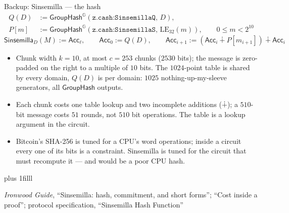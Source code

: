 \documentclass[aspectratio=169,11pt]{beamer}
\newcommand{\G}{\mathbb{G}}
\newcommand{\GroupHash}{\ensuremath{\mathsf{GroupHash}}}
\newcommand{\src}[1]{\par\vskip0pt plus 1filll
  {\fontsize{6}{7.2}\selectfont\color{arbdim}\raggedright #1\par}}
\begin{document}
\begin{frame}{Backup: Sinsemilla --- the hash}
\vspace*{-4pt}
\setlength{\abovedisplayskip}{3pt}\setlength{\belowdisplayskip}{3pt}
\begin{align*}
Q(D) &:= \GroupHash^{\G}(\texttt{z.cash:SinsemillaQ},\, D),\\
P[m] &:= \GroupHash^{\G}(\texttt{z.cash:SinsemillaS},\, \mathrm{LE}_{32}(m)),
  \qquad 0 \le m < 2^{10}
\end{align*}
\[
\mathsf{Sinsemilla}_D(M) := \mathsf{Acc}_\ell, \qquad
\mathsf{Acc}_0 := Q(D), \qquad
\mathsf{Acc}_{i+1} := (\mathsf{Acc}_i \dotplus P[m_{i+1}]) \dotplus
\mathsf{Acc}_i
\]
\begin{itemize}\small
  \item Chunk width $k = 10$, at most $c = 253$ chunks ($2530$ bits); the
    message is zero-padded on the right to a multiple of $10$ bits. The
    $1024$-point table is shared by every domain, $Q(D)$ is per domain:
    $1025$ nothing-up-my-sleeve generators, all $\GroupHash$ outputs.
  \item Each chunk costs one table lookup and two incomplete additions
    ($\dotplus$); a $510$-bit message costs $51$ rounds, not $510$ bit
    operations. The table is a lookup argument in the circuit.
  \item Bitcoin's SHA-256 is tuned for a CPU's word operations; inside a
    circuit every one of its bits is a constraint. Sinsemilla is tuned
    for the circuit that must recompute it --- and would be a poor CPU
    hash.
\end{itemize}
\src{\emph{Ironwood Guide}, ``Sinsemilla: hash, commitment, and short
forms''; ``Cost inside a proof''; protocol specification,
``Sinsemilla Hash Function''}
\end{frame}
\end{document}
